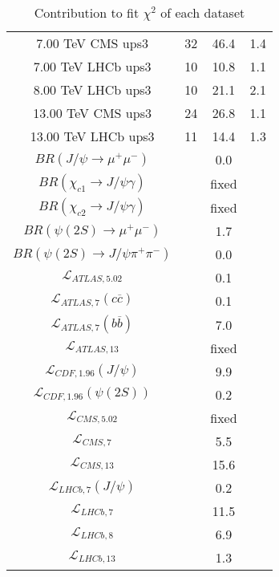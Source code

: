 \begin{table}[h!]
\begin{tabular}{c|c|c|c}
7.00 TeV CMS ups3 & 32 & 46.4 & 1.4 \\
7.00 TeV LHCb ups3 & 10 & 10.8 & 1.1 \\
8.00 TeV LHCb ups3 & 10 & 21.1 & 2.1 \\
13.00 TeV CMS ups3 & 24 & 26.8 & 1.1 \\
13.00 TeV LHCb ups3 & 11 & 14.4 & 1.3 \\
\hline
$BR(J/\psi\rightarrow\mu^+\mu^-)$ &  & 0.0 &  \\
$BR(\chi_{c1}\rightarrow J/\psi\gamma)$ &  & fixed & \\
$BR(\chi_{c2}\rightarrow J/\psi\gamma)$ &  & fixed & \\
$BR(\psi(2S)\rightarrow\mu^+\mu^-)$ &  & 1.7 &  \\
$BR(\psi(2S)\rightarrow J/\psi\pi^+\pi^-)$ &  & 0.0 &  \\
$\mathcal L_{ATLAS,5.02}$ &  & 0.1 &  \\
$\mathcal L_{ATLAS,7}(c\overline c)$ &  & 0.1 &  \\
$\mathcal L_{ATLAS,7}(b\overline b)$ &  & 7.0 &  \\
$\mathcal L_{ATLAS,13}$ &  & fixed & \\
$\mathcal L_{CDF,1.96}(J/\psi)$ &  & 9.9 &  \\
$\mathcal L_{CDF,1.96}(\psi(2S))$ &  & 0.2 &  \\
$\mathcal L_{CMS,5.02}$ &  & fixed & \\
$\mathcal L_{CMS,7}$ &  & 5.5 &  \\
$\mathcal L_{CMS,13}$ &  & 15.6 &  \\
$\mathcal L_{LHCb,7}(J/\psi)$ &  & 0.2 &  \\
$\mathcal L_{LHCb,7}$ &  & 11.5 &  \\
$\mathcal L_{LHCb,8}$ &  & 6.9 &  \\
$\mathcal L_{LHCb,13}$ &  & 1.3 &  \\
\end{tabular}
\caption{Contribution to fit $\chi^2$ of each dataset}
\end{table}
